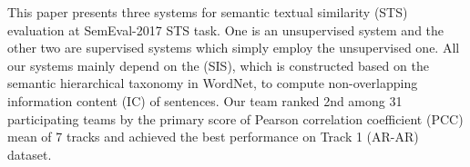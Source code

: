 This paper presents three systems for semantic textual similarity (STS) evaluation at SemEval-2017 STS task. One is an unsupervised system and the other two are supervised systems which simply employ the unsupervised one. All our systems mainly depend on the (SIS), which is constructed based on the semantic hierarchical taxonomy in WordNet, to compute non-overlapping information content (IC) of sentences. Our team ranked 2nd among 31 participating teams by the primary score of Pearson correlation coefficient (PCC) mean of 7 tracks and achieved the best performance on Track 1 (AR-AR) dataset.
